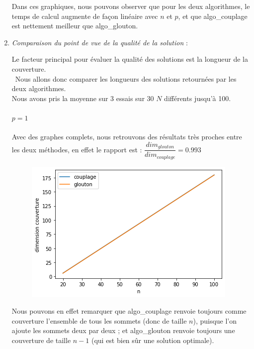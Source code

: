 \documentclass[12pt]{article}
\begin{document}
\begin{enumerate}
                Dans ces graphiques, nous pouvons observer que pour les deux algorithmes, le temps de calcul augmente de façon linéaire avec $n$ et $p$, et que algo\_couplage est nettement meilleur que algo\_glouton.

            \item \textit{Comparaison du point de vue de la qualité de la solution} :  

                Le facteur principal pour évaluer la qualité des solutions est la longueur de la couverture. \\\
                Nous allons donc comparer les longueurs des solutions retournées par les deux algorithmes. \\
                Nous avons pris la moyenne sur 3 essais sur 30 $N$ différents jusqu'à 100.

                \paragraph{$p = 1$} 
                    Avec des graphes complets, nous retrouvons des résultats très proches entre les deux méthodes, en effet le rapport est :
                $\dfrac{dim_{glouton}}{dim_{couplage}} = 0.993 $


                    \begin{figure}[h]
                        \includegraphics[scale=0.5]{figures/qualite_1.png}
                        \centering
                    \end{figure}

                    Nous pouvons en effet remarquer que algo\_couplage renvoie toujours comme couverture l'ensemble de tous les sommets (donc de taille $n$), puisque l'on ajoute les sommets deux par deux ; et algo\_glouton renvoie toujours une couverture de taille $n-1$ (qui est bien sûr une solution optimale).


\end{enumerate}
\end{document}
